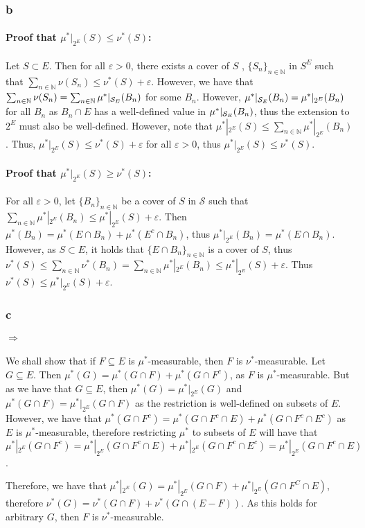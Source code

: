 \documentclass{article}
\theoremstyle{definition}
\numberwithin{theorem}{section}
\numberwithin{equation}{section}
\newcommand{\sig}{\mathcal{S}}
\begin{document}
\subsubsection{b}
\paragraph{Proof that $\mu^*|_{2^E}(S) \leq \nu^*(S)$:}
Let $S \subset E$. Then for all $\varepsilon > 0$, there exists a cover of $S$ , $\lbrace S_n \rbrace_{n \in \mathbb{N}}$ in $S^E$ such that $\sum_{n \in \mathbb{N}} \nu(S_n) \leq \nu^*(S) + \varepsilon$. However, we have that $\sum_{n \in \mathbb{N}} \nu(S_n) = \sum_{n \in \mathbb{N}} \mu^*|_{\mathcal{S}_E}(B_n)$ for some $B_n$. However, $ \mu^*|_{\mathcal{S}_E}(B_n) = \mu^*|_{2^E}(B_n)$ for all $B_n$ as $B_n \cap E$ has a well-defined value in $\mu^*|_{\mathcal{S}_E}(B_n)$, thus the extension to $2^E$ must also be well-defined. However, note that $\mu^*|_{2^E}(S) \leq \sum_{n \in \mathbb{N}} \mu^*|_{2^E}(B_n)$. Thus, $\mu^*|_{2^E}(S) \leq \nu^*(S) + \varepsilon$ for all $\varepsilon > 0$, thus $ \mu^*|_{2^E}(S) \leq \nu^*(S) $.
\paragraph{Proof that $\mu^*|_{2^E}(S) \geq \nu^*(S)$:}
For all $\varepsilon > 0$, let $\lbrace B_n \rbrace_{n \in \mathbb{N}}$ be a cover of $S$ in $\sig$ such that $\sum_{n \in \mathbb{N}}\mu^*|_{2^E}(B_n) \leq \mu^*|_{2^E}(S) + \varepsilon$. Then $\mu^*(B_n) = \mu^*(E \cap B_n) + \mu^*(E^c \cap B_n)$, thus $\mu^*|_{2^E}(B_n) = \mu^*(E \cap B_n)$. However, as $S \subset E$, it holds that $ \lbrace E \cap B_n \rbrace_{n \in \mathbb{N}}$ is a cover of $S$, thus $\nu^*(S) \leq \sum_{n \in \mathbb{N}}\nu^*(B_n) = \sum_{n \in \mathbb{N}}\mu^*|_{2^E}(B_n) \leq \mu^*|_{2^E}(S) + \varepsilon$. Thus $\nu^*(S) \leq \mu^*|_{2^E}(S) + \varepsilon$. 
\subsubsection{c}
\paragraph{$\Rightarrow$}
We shall show that if $F \subseteq E$ is $\mu^*$-measurable, then $F$ is $\nu^*$-measurable. Let $G \subseteq E$. Then $\mu^*(G) = \mu^*(G \cap F) + \mu^*(G \cap F^c)$, as $F$ is $\mu^*$-measurable. But as we have that $G \subseteq E$, then $\mu^*(G) = \mu^*|_{2^E}(G)$ and $\mu^*(G \cap F) = \mu^*|_{2^E}(G \cap F)$ as the restriction is well-defined on subsets of $E$. However, we have that $\mu^* (G \cap F^c) = \mu^*(G \cap F^c \cap E) + \mu^*(G \cap F^c \cap E^c)$ as $E$ is $\mu^*$-measurable, therefore restricting $\mu^*$ to subsets of $E$ will have that $\mu^*|_{2^E}(G \cap F^c) = \mu^*|_{2^E}(G \cap F^c \cap E) +  \mu^*|_{2^E}(G \cap F^c \cap E^c) = \mu^*|_{2^E}(G \cap F^c \cap E)$.
\par
Therefore, we have that $\mu^*|_{2^E}(G) = \mu^*|_{2^E}(G \cap F) + \mu^*|_{2^E}(G \cap F^C \cap E)$, therefore $\nu^*(G) = \nu^*(G \cap F) + \nu^*(G \cap (E- F))$. As this holds for arbitrary $G$, then $F$ is $\nu^*$-measurable.
\end{document}
